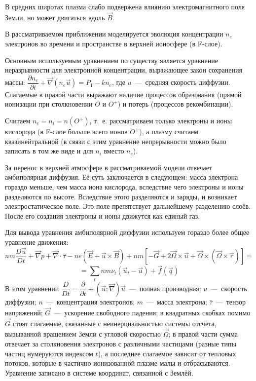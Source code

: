 \documentclass[14pt, a4paper, fleqn, twoside]{extreport}
\theoremstyle{definiton}
\theoremstyle{definition}
\begin{document}
В средних широтах плазма слабо подвержена влиянию электромагнитного поля Земли, но может двигаться вдоль $\vec{B}$.

\bigskip

В рассматриваемом приближении моделируется эволюция концентрации $n_e$ электронов во времени и пространстве в верхней ионосфере (в F-слое).

\medskip

Основным используемым уравнением по существу является уравнение неразрывности для электронной концентрации, выражающее закон сохранения массы: $\dfrac{\partial n_e}{\partial t}+\vec{\nabla}(n_e \vec{u})=P_1-kn_e$, где $u$~---~средняя скорость диффузии. Слагаемые в правой части выражают наличие процессов образования (прямой ионизации при столкновении $O$ и $O^+$) и потерь (процессов рекомбинации).

Считаем $n_e=n_i = n(O^+)$, т.~е. рассматриваем только электроны и ионы кислорода (в F-слое больше всего ионов $O^+$), а плазму считаем квазинейтральной (в связи с этим уравнение непрерывности можно было записать в том же виде и для $n_i$ вместо $n_e$).

\bigskip

За перенос в верхней атмосфере в рассматриваемой модели отвечает амбиполярная диффузия. Её суть заключается в следующем: масса электрона гораздо меньше, чем масса иона кислорода, вследствие чего электроны и ионы разделяются по высоте. Вследствие этого разделяются и заряды, и возникает электростатическое поле. Это поле препятствует дальнейшему разделению слоёв. После его создания электроны и ионы движутся как единый газ.

Для вывода уравнения амбиполярной диффузии используем гораздо более общее уравнение движения: $$nm\dfrac{D\vec{u}}{Dt}+\vec{\nabla} p + \vec{\nabla}\cdot \hat{\tau} - ne(\vec{E}+\vec{u}\times \vec{B})+nm[-\vec{G}+2\vec{\Omega}\times \vec{u}+\vec{\Omega}\times(\vec{\Omega}\times\vec{r})]=$$
$$=\sum_t nm\nu_t (\vec{u}_t-\vec{u})+ \vec{f}(\vec{q})$$
В этом уравнении $\dfrac{D}{Dt}=\dfrac{\partial}{\partial t}+(\vec{u}; \vec{\nabla})\vec{u}$~---~полная производная; $u$~---~скорость диффузии; $n$~---~концентрация электронов; $m$~---~масса электрона; $\hat{\tau}$~---~тензор напряжений; $\vec{G}$~---~ускорение свободного падения; в квадратных скобках помимо $\vec{G}$ стоят слагаемые, связанные с неинерциальностью системы отсчета, вызыванной вращением Земли с угловой скоростью $\vec{\Omega}$; в правой части сумма отвечает за столкновения электронов с различными частицами (разные типы частиц нумеруются индексом $t$), а последнее слагаемое зависит от тепловых потоков, которые в частично ионизованной плазме малы и отбрасываются. Уравнение записано в системе координат, связанной с Землёй.
\end{document}
